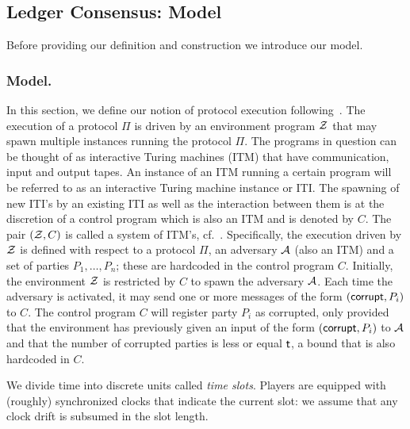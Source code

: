 \subsection{Ledger Consensus: Model}
Before providing our definition and construction we introduce our model.

\subsubsection{Model.}

In this section, we define our notion of protocol execution following~\cite{DBLP:conf/eurocrypt/GarayKL15,DBLP:conf/focs/Canetti01}.
The execution of a protocol $\Pi$ is driven by an
environment program $\mathcal{Z}$ that may spawn multiple instances running the protocol $\Pi$. The programs
in question can be thought of as interactive Turing machines (ITM) that have communication,
input and output tapes. An instance of an ITM running a certain program will be referred to as
an interactive Turing machine instance or ITI. The spawning of new ITI's by an existing ITI as
well as the interaction between them is at the discretion of a control program which is also an ITM
and is denoted by $C$. The pair $(\mathcal{Z}, C)$ is called a system of ITM's, cf.~\cite{DBLP:conf/focs/Canetti01}. 
Specifically, the execution driven by $\mathcal{Z}$ is defined with respect to a protocol $\Pi$, an adversary $\mathcal{A}$
(also an ITM) and a set of parties $P_1,\dots,P_n$; these are hardcoded in the control program $C$. 
Initially, the environment $\mathcal{Z}$ is restricted by $C$ to spawn the adversary $\mathcal{A}$. Each time the
adversary is activated, it may send one or more messages of the form $(\mathsf{corrupt}, P_i)$ to $C$. The control
program $C$ will register party $P_i$ as corrupted, only provided that the environment has previously
given an input of the form $(\mathsf{corrupt}, P_i)$ to $\mathcal{A}$ and that the number of corrupted parties is less or
equal $\mathsf{t}$, a bound that is also hardcoded in $C$. 

We divide time into discrete units called \emph{time slots}. Players are equipped with (roughly)
synchronized clocks that indicate the current slot: we assume that any clock drift is subsumed in the slot
length. 





